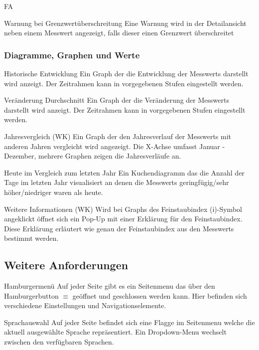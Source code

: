 \begin{Kriterien}{FA}
 \item[Warnung bei Grenzwertüberschreitung]
  Eine Warnung wird in der Detailansicht neben einem \gls{Messwert} angezeigt, falls dieser einen Grenzwert überschreitet

 \subsubsection{Diagramme, Graphen und Werte}

 \item[Historische Entwicklung]
   Ein Graph der die Entwicklung der \glspl{Messwert} darstellt wird anzeigt.
   Der Zeitrahmen kann in vorgegebenen Stufen eingestellt werden.
 
 \item[Veränderung Durchschnitt]
   Ein Graph der die Veränderung der \glspl{Messwert} darstellt wird anzeigt.
   Der Zeitrahmen kann in vorgegebenen Stufen eingestellt werden.

 \item[Jahresvergleich (WK)]
   Ein Graph der den Jahresverlauf der \glspl{Messwert} mit anderen Jahren vergleicht wird angezeigt.
   Die X-Achse umfasst Januar - Dezember, mehrere Graphen zeigen die Jahresverläufe an.

 \item[Heute im Vergleich zum letzten Jahr]
   Ein \gls{Kuchendiagramm} das die Anzahl der Tage im letzten Jahr visualisiert an denen die \glspl{Messwert} geringfügig/sehr höher/niedriger waren als heute.

 \item[Weitere Informationen (WK)]
   Wird bei \glspl{Graph} des \gls{Feinstaubindex} (i)-Symbol angeklickt öffnet sich ein \gls{Pop-Up} mit einer Erklärung für den \gls{Feinstaubindex}.
   Diese Erklärung erläutert wie genau der \gls{Feinstaubindex} aus den \glspl{Messwert} bestimmt werden.

\subsection{Weitere Anforderungen}

 \item[Hamburgermenü]
  Auf jeder Seite gibt es ein \gls{Seitenmenu} das über den Hamburgerbutton $\equiv$ geöffnet und geschlossen werden kann.
  Hier befinden sich verschiedene Einstellungen und Navigationselemente.

 \item[Sprachauswahl]
   Auf jeder Seite befindet sich eine Flagge im \gls{Seitenmenu} welche die aktuell ausgewählte Sprache repräsentiert.
   Ein \gls{Dropdown-Menu} wechselt zwischen den verfügbaren Sprachen.


\end{Kriterien}
